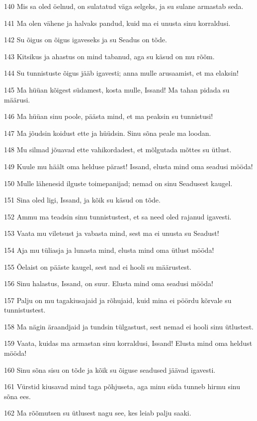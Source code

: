 \par 140 Mis sa oled öelnud, on sulatatud väga selgeks, ja su sulane armastab seda.
\par 141 Ma olen vähene ja halvaks pandud, kuid ma ei unusta sinu korraldusi.
\par 142 Su õigus on õigus igaveseks ja su Seadus on tõde.
\par 143 Kitsikus ja ahastus on mind tabanud, aga su käsud on mu rõõm.
\par 144 Su tunnistuste õigus jääb igavesti; anna mulle arusaamist, et ma elaksin!
\par 145 Ma hüüan kõigest südamest, kosta mulle, Issand! Ma tahan pidada su määrusi.
\par 146 Ma hüüan sinu poole, päästa mind, et ma peaksin su tunnistusi!
\par 147 Ma jõudsin koidust ette ja hüüdsin. Sinu sõna peale ma loodan.
\par 148 Mu silmad jõuavad ette vahikordadest, et mõlgutada mõttes su ütlust.
\par 149 Kuule mu häält oma helduse pärast! Issand, elusta mind oma seadusi mööda!
\par 150 Mulle lähenesid ilguste toimepanijad; nemad on sinu Seadusest kaugel.
\par 151 Sina oled ligi, Issand, ja kõik su käsud on tõde.
\par 152 Ammu ma teadsin sinu tunnistustest, et sa need oled rajanud igavesti.
\par 153 Vaata mu viletsust ja vabasta mind, sest ma ei unusta su Seadust!
\par 154 Aja mu tüliasja ja lunasta mind, elusta mind oma ütlust mööda!
\par 155 Õelaist on pääste kaugel, sest nad ei hooli su määrustest.
\par 156 Sinu halastus, Issand, on suur. Elusta mind oma seadusi mööda!
\par 157 Palju on mu tagakiusajaid ja rõhujaid, kuid mina ei pöördu kõrvale su tunnistustest.
\par 158 Ma nägin äraandjaid ja tundsin tülgastust, sest nemad ei hooli sinu ütlustest.
\par 159 Vaata, kuidas ma armastan sinu korraldusi, Issand! Elusta mind oma heldust mööda!
\par 160 Sinu sõna sisu on tõde ja kõik su õiguse seadused jäävad igavesti.
\par 161 Vürstid kiusavad mind taga põhjuseta, aga minu süda tunneb hirmu sinu sõna ees.
\par 162 Ma rõõmutsen su ütlusest nagu see, kes leiab palju saaki.

